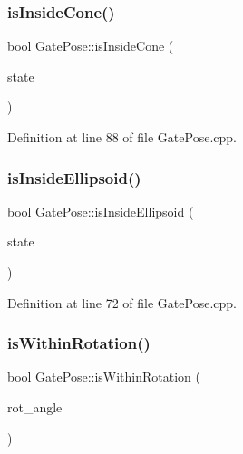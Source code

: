 \subsubsection{\texorpdfstring{is\+Inside\+Cone()}{isInsideCone()}}
{\footnotesize\ttfamily bool Gate\+Pose\+::is\+Inside\+Cone (\begin{DoxyParamCaption}\item[{const Eigen\+::\+Ref$<$ const Eigen\+::\+Vector\+Xf $>$ \&}]{state }\end{DoxyParamCaption})\hspace{0.3cm}{\ttfamily [protected]}}



Definition at line 88 of file Gate\+Pose.\+cpp.

\mbox{\label{classGatePose_a880273787b1b3542e1e7971954ac118d}} 
\subsubsection{\texorpdfstring{is\+Inside\+Ellipsoid()}{isInsideEllipsoid()}}
{\footnotesize\ttfamily bool Gate\+Pose\+::is\+Inside\+Ellipsoid (\begin{DoxyParamCaption}\item[{const Eigen\+::\+Ref$<$ const Eigen\+::\+Vector\+Xf $>$ \&}]{state }\end{DoxyParamCaption})\hspace{0.3cm}{\ttfamily [protected]}}



Definition at line 72 of file Gate\+Pose.\+cpp.

\mbox{\label{classGatePose_a6d188756ed5dcc56c311a2aafc9d1acd}} 
\subsubsection{\texorpdfstring{is\+Within\+Rotation()}{isWithinRotation()}}
{\footnotesize\ttfamily bool Gate\+Pose\+::is\+Within\+Rotation (\begin{DoxyParamCaption}\item[{float}]{rot\+\_\+angle }\end{DoxyParamCaption})\hspace{0.3cm}{\ttfamily [protected]}}



